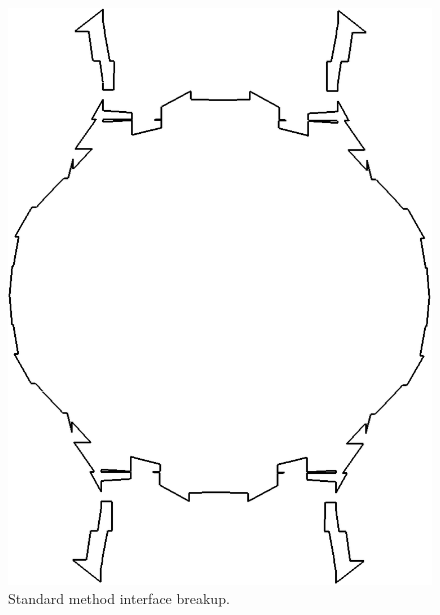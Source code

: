 \begin{figure}[htbp]
	\centering
		\includegraphics[scale=0.25]{figs/bad.png}
	\caption{Standard method interface breakup.}
	\label{bad2} 
\end{figure} 
